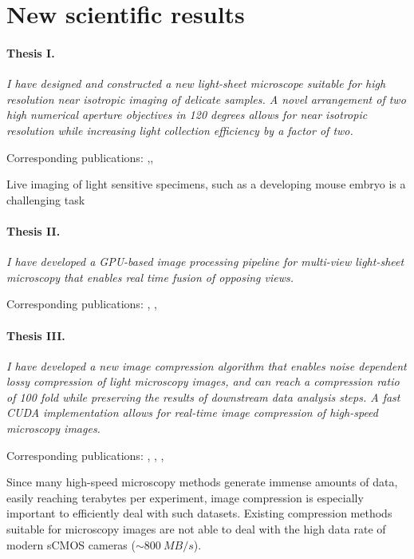 
\section{New scientific results}

  \paragraph{Thesis I.}\textit{I have designed and constructed a new light-sheet microscope suitable for high resolution near isotropic imaging of delicate samples. A novel  arrangement of two high numerical aperture objectives in 120 degrees allows for near isotropic resolution while increasing light collection efficiency by a factor of two.}
  
    Corresponding publications: \cite{de_medeiros_light-sheet_2016},\cite{strnad_inverted_2016}, \cite{hoyer_breaking_2016}

    Live imaging of light sensitive specimens, such as a developing mouse embryo is a challenging task

  \paragraph{Thesis II.} \textit{I have developed a GPU-based image processing pipeline for multi-view light-sheet microscopy that enables real time fusion of opposing views.}

    Corresponding publications: \cite{balazs_gpu-based_2016}, \cite{balazs_gpu-based_2016-1}, \cite{balazs_gpu-based_2017}



  \paragraph{Thesis III.} \textit{I have  developed a new image compression algorithm that enables noise dependent lossy compression of light microscopy images, and can reach a compression ratio of 100 fold while preserving the results of downstream data analysis steps. A fast CUDA implementation allows for real-time image compression of high-speed microscopy images.}

    Corresponding publications: \cite{balazs_real-time_2017}, \cite{balazs_gpu-based_2016}, \cite{balazs_gpu-based_2016-1}, \cite{balazs_gpu-based_2017}
    
    Since many high-speed microscopy methods generate immense amounts of data, easily reaching terabytes per experiment, image compression is especially important to efficiently deal with such datasets. Existing compression methods suitable for microscopy images are not able to deal with the high data rate of modern sCMOS cameras ($\sim \SI{800}{MB/s}$).

